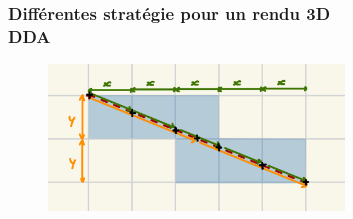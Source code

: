 \documentclass{beamer}
\begin{document}
\begin{frame}
    \frametitle{Différentes stratégie pour un rendu 3D \\
                \small DDA}           
    \begin{block}{}
    \end{block}    
    \begin{figure}
        \centering
        \includegraphics[width=0.7\textwidth]{images/DDA.jpg}
    \end{figure}
\end{frame}

\end{document}
